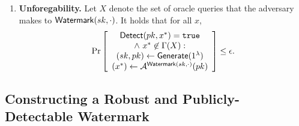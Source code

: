 \documentclass[12pt]{article}
\begin{document}
\begin{definition}
\begin{enumerate}
    \item \textbf{Unforegability.}
    Let $X$ denote the set of oracle queries that the adversary makes to $\mathsf{Watermark}(sk, \cdot)$.
    It holds that for all $x$,
    \begin{align*}
        \Pr\left[
        \begin{array}{ccc}
            \begin{matrix}
                \mathsf{Detect}(pk, x^*) = \mathtt{true} \\
                \land\ x^* \not\in \Gamma(X): \\
                (sk, pk) \gets \mathsf{Generate}(1^\lambda) \\
                (x^*) \gets \mathcal{A}^{\mathsf{Watermark}(sk, \cdot)}(pk) \\
            \end{matrix} \\
        \end{array}
        \right] \leq \epsilon.
    \end{align*}
\end{enumerate}

\end{definition}

\subsection{Constructing a Robust and Publicly-Detectable Watermark}\label{app:embed_to_watermark}
\end{document}
